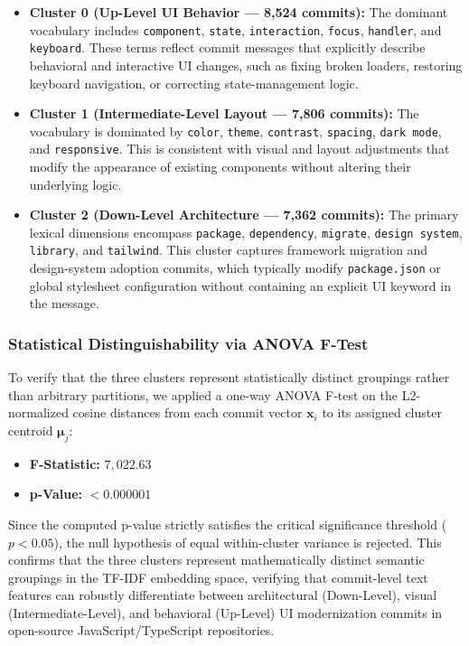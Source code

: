 \documentclass{article}
\begin{document}
\begin{itemize}
    \item \textbf{Cluster 0 (Up-Level UI Behavior --- 8,524 commits):}
    The dominant vocabulary includes \texttt{component}, \texttt{state},
    \texttt{interaction}, \texttt{focus}, \texttt{handler}, and
    \texttt{keyboard}. These terms reflect commit messages that
    explicitly describe behavioral and interactive UI changes, such as
    fixing broken loaders, restoring keyboard navigation, or correcting
    state-management logic.

    \item \textbf{Cluster 1 (Intermediate-Level Layout --- 7,806 commits):}
    The vocabulary is dominated by \texttt{color}, \texttt{theme},
    \texttt{contrast}, \texttt{spacing}, \texttt{dark mode}, and
    \texttt{responsive}. This is consistent with visual and layout
    adjustments that modify the appearance of existing components
    without altering their underlying logic.

    \item \textbf{Cluster 2 (Down-Level Architecture --- 7,362 commits):}
    The primary lexical dimensions encompass \texttt{package},
    \texttt{dependency}, \texttt{migrate}, \texttt{design system},
    \texttt{library}, and \texttt{tailwind}. This cluster captures
    framework migration and design-system adoption commits, which
    typically modify \texttt{package.json} or global stylesheet
    configuration without containing an explicit UI keyword in the
    message.
\end{itemize}

\subsubsection{Statistical Distinguishability via ANOVA F-Test}

To verify that the three clusters represent statistically distinct
groupings rather than arbitrary partitions, we applied a one-way ANOVA
F-test on the L2-normalized cosine distances from each commit vector
$\mathbf{x}_i$ to its assigned cluster centroid $\boldsymbol{\mu}_j$:

\begin{itemize}
    \item \textbf{F-Statistic:} $7{,}022.63$
    \item \textbf{p-Value:} $< 0.000001$
\end{itemize}

Since the computed p-value strictly satisfies the critical significance
threshold ($p < 0.05$), the null hypothesis of equal within-cluster
variance is rejected. This confirms that the three clusters represent
mathematically distinct semantic groupings in the TF-IDF embedding space,
verifying that commit-level text features can robustly differentiate
between architectural (Down-Level), visual (Intermediate-Level), and
behavioral (Up-Level) UI modernization commits in open-source
JavaScript/TypeScript repositories.
\end{document}
